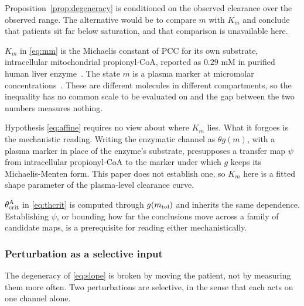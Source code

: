 \begin{remark}
\label{rem:no_km_orig}
Proposition~\ref{prop:degeneracy} is conditioned on the observed clearance over the
observed range. The alternative would be to compare $m$ with $K_m$ and conclude that
patients sit far below saturation, and that comparison is unavailable here.

$K_m$ in \eqref{eq:mm} is the Michaelis constant of PCC for its own substrate,
intracellular mitochondrial propionyl-CoA, reported as $0.29$ mM in purified human liver
enzyme~\cite{pcc_liver_kinetics}. The state $m$ is a plasma marker at micromolar
concentrations~\cite{amd_phenotyping}. %
These are different molecules in different compartments, so the inequality has no common
scale to be evaluated on and the gap between the two numbers measures nothing.

Hypothesis \eqref{eq:affine} requires no view about where $K_m$ lies. What it forgoes is
the mechanistic reading. Writing the enzymatic channel as $\theta g(m)$, with a plasma
marker in place of the enzyme's substrate, presupposes a transfer map $\psi$ from
intracellular propionyl-CoA to the marker under which $g$ keeps its Michaelis-Menten form.
This paper does not establish one, so $K_m$ here is a fitted shape parameter of the
plasma-level clearance curve.

$\theta_{\mathrm{crit}}^{\mathrm{A}}$ in \eqref{eq:thcrit} is computed through $g(m_{\mathrm{tol}})$ and inherits the same
dependence. Establishing $\psi$, or bounding how far the conclusions move across a family
of candidate maps, is a prerequisite for reading either mechanistically.
\end{remark}

\subsubsection{Perturbation as a selective input}
\label{sec:selective}

The degeneracy of \eqref{eq:slope} is broken by moving the patient, not by measuring them
more often. Two perturbations are selective, in the sense that each acts on one channel
alone.

